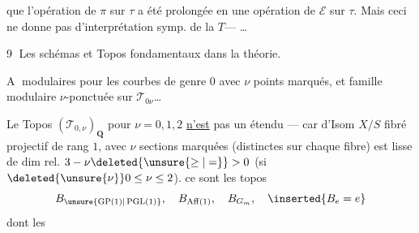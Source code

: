 que l'opération de $\pi$ sur $\tau$ a été prolongée en une opération de $\mathcal E$ sur $\tau$. Mais ceci ne donne pas d'interprétation symp. de la $T$--- \ldots
{}

\textcircled{9} Les schémas et Topos fondamentaux dans la théorie.

\textcircled{A}   modulaires  pour les courbes de genre $0$ avec $\nu$ points marqués, et famille  modulaire  $\nu$-ponctuée sur $\mathcal T_{0\nu}$\ldots

Le Topos $(\mathcal T_{0,\nu})_{\mathbf Q}$ pour $\nu=0,1,2$ \uline{n'est} pas un étendu --- car  d'Isom  $X/S$ fibré projectif de rang $1$, avec $\nu$ sections marquées (distinctes sur chaque fibre) est lisse de dim rel. $3-\nu\deleted{\unsure{\geq|=}}>0$ (si $\deleted{\unsure{\nu}}0\leq\nu\leq2$).
  ce sont les topos
\[
B_{\unsure{\operatorname{GP}(1)|\operatorname{PGL}(1)}},\quad B_{\operatorname{Aff}(1)},\quad B_{G_m},\quad\inserted{B_e=e}
\]
dont les
